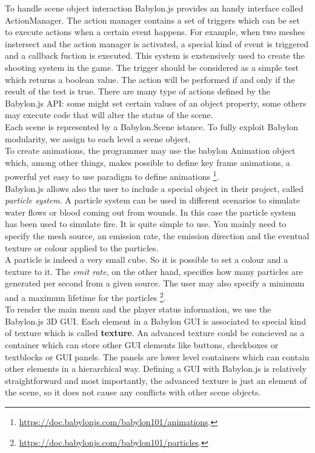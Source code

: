 \documentclass[14pt]{article}
\begin{document}
To handle scene object interaction Babylon.js provides an handy interface called ActionManager. The action manager contains a set of triggers which can be set to execute actions when a certain event happens. For example, when two meshes instersect and the action manager is activated, a special kind of event is triggered and a callback fuction is executed. This system is exstensively used to create the shooting system in the game. The trigger should be considered as a simple test which returns a boolean value. The action will be performed if and only if the result of the test is true. There are many type of actions defined by the Babylon.js API: some might set certain values of an object property, some others may execute code that will alter the status of the scene.\\
Each scene is represented by a Babylon.Scene istance. To fully exploit Babylon modularity, we assign to each level a scene object.\\
To create animations, the programmer may use the babylon Animation object which, among other things, makes possible to define key frame animations, a powerful yet easy to use paradigm to define animations \footnote{\url{https://doc.babylonjs.com/babylon101/animations}.}. \\
Babylon.js allows also the user to include a special object in their project, called \textit{particle system}. A particle system can be used in different scenarios to simulate water flows or blood coming out from wounds. In this case the particle system has been used to simulate fire. It is quite simple to use. You mainly need to specify the mesh source, an emission rate, the emission direction and the eventual texture or colour applied to the particles.\\
A particle is indeed a very small cube. So it is possible to set a colour and a texture to it. The \textit{emit rate}, on the other hand, specifies how many particles are generated per second from a given source. The user may also specify a minimum and a maximum lifetime for the particles 
\footnote{\url{https://doc.babylonjs.com/babylon101/particles}.}.\\

To render the main menu and the player status information, we use the Babylon.js 3D GUI. Each element in a Babylon GUI is associated to special kind of texture which is called \textbf{ texture}. An advanced texture could be concieved as a container which can store other GUI elements like buttons, checkboxes or textblocks or GUI panels. The panels are lower level containers which can contain other elements in a hierarchical way. Defining a GUI with Babylon.js is relatively straightforward and most importantly, the advanced texture is just an element of the scene, so it does not cause any conflicts with other scene objects.\\
\end{document}
